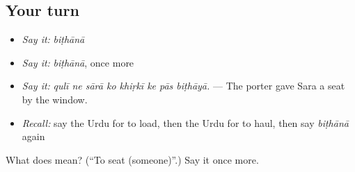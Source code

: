 \subsection*{Your turn}
\begin{itemize}
\raggedright
  \item \emph{Say it:} \emph{biṭhānā}
  \item \emph{Say it:} \emph{biṭhānā}, once more
  \item \emph{Say it:} \emph{qulī ne sārā ko khiṛkī ke pās biṭhāyā.} — The porter gave Sara a seat by the window.
  \item \emph{Recall:} say the Urdu for to load, then the Urdu for to haul, then say \emph{biṭhānā} again
\end{itemize}

\begin{tcolorbox}[breakable,colback=teal!4,colframe=teal!35!black,title={Before you move on}]
What does  mean? (\textquotedblleft{}To seat (someone)\textquotedblright{}.) Say it once more.
\end{tcolorbox}
